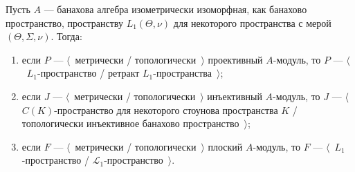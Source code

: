 \begin{proposition}\label{TopProjInjFlatModOverL1Charac} Пусть $A$ --- банахова
алгебра изометрически изоморфная, как банахово пространство, пространству
$L_1(\Theta,\nu)$ для некоторого пространства с мерой $(\Theta,\Sigma,\nu)$.
Тогда:
\begin{enumerate}[label = (\roman*)]
    \item если $P$ --- $\langle$~метрически / топологически~$\rangle$
    проективный $A$-модуль, то $P$ --- $\langle$~$L_1$-пространство / ретракт
    $L_1$-пространства~$\rangle$;

    \item если $J$ --- $\langle$~метрически / топологически~$\rangle$
    инъективный $A$-модуль, то $J$ --- $\langle$~$C(K)$-пространство для
    некоторого стоунова пространства $K$ / топологически инъективное банахово
    пространство~$\rangle$;

    \item если $F$ --- $\langle$~метрически / топологически~$\rangle$ плоский
    $A$-модуль, то $F$ --- $\langle$~$L_1$-пространство /
    $\mathscr{L}_1$-пространство~$\rangle$.
\end{enumerate}
\end{proposition}
